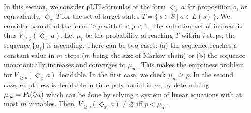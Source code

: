\documentclass{llncs}
\renewcommand{\Pr}{\mbox{\rm Pr}}
\renewcommand{\Pr}{\mbox{\sl Pr}}
\newcommand{\set}[1]{\{ \, #1 \, \}}
\renewcommand{\geq}{\geqslant}
\renewcommand{\emptyset}{\varnothing}
\newcommand{\de}{\Diamond}
\begin{document}
In this section, we consider pLTL-formulas of the form $\de_{x} \, a$ for proposition $a$, or equivalently, $\de_{x} \, T$ for the set of target states $T = \set{s \in S \mid a \in L(s)}$.
We consider bounds of the form $\geq p$ with $0 < p < 1$.
The valuation set of interest is thus $V_{\geq p}(\de_{x} \, a)$.
Let $\mu_i$ be the probability of reaching $T$ within $i$ steps; the sequence $\{\mu_i\}$ is ascending. 
There can be two cases: (a) the sequence reaches a constant value in $m$ steps ($m$ being the size of Markov chain) or (b) the sequence monotonically increases and converges to $\mu_\infty$. 
This makes the emptiness problem for $V_{\geq p}(\de_{x} \, a)$ decidable. 
In the first case, we check $\mu_m\geq p$.
In the second case, emptiness is decidable in time polynomial  in $m$, by determining $\mu_\infty = \Pr (\de a)$ which can be done by solving a system of linear equations with at most $m$ variables.
Then, $V_{\geq p}(\de_x \, a) \neq \emptyset$ iff $p < \mu_\infty$.
\end{document}

